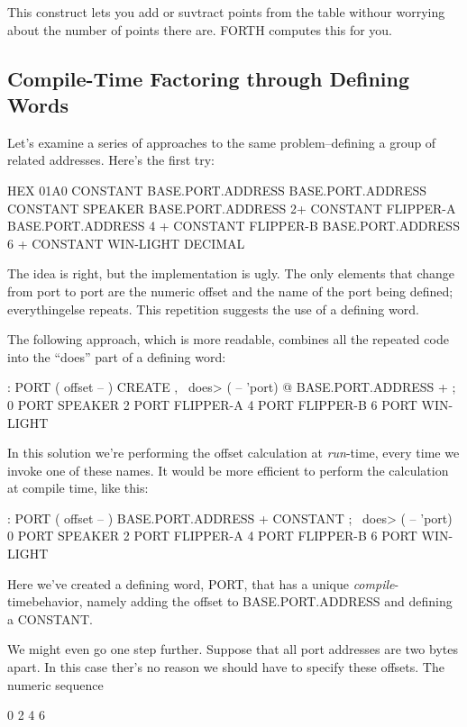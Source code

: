 This construct lets you add or suvtract points from the table withour worrying about the number of points there are. FORTH computes this for you.

\subsection{{Compile-Time Factoring through Defining Words}}

Let's examine a series of approaches to the same problem--defining a group of related addresses. Here's the first try:

\begin{Code}
HEX 01A0 CONSTANT BASE.PORT.ADDRESS
BASE.PORT.ADDRESS CONSTANT SPEAKER
BASE.PORT.ADDRESS 2+ CONSTANT FLIPPER-A
BASE.PORT.ADDRESS 4 + CONSTANT FLIPPER-B
BASE.PORT.ADDRESS 6 + CONSTANT WIN-LIGHT
DECIMAL
\end{Code}
The idea is right, but the implementation is ugly. The only elements that change from port to port are the numeric offset and the name of the port being defined; everythingelse repeats. This repetition suggests the use of a defining word.

The following approach, which is more readable, combines all the repeated code into the ``does'' part  of a defining word:

\begin{Code}
: PORT  ( offset -- )  CREATE ,
   \ does>  ( -- 'port) @ BASE.PORT.ADDRESS + ;
0 PORT SPEAKER
2 PORT FLIPPER-A
4 PORT FLIPPER-B
6 PORT WIN-LIGHT
\end{Code}
In this solution we're performing the offset calculation at \emph{run}-time, every time we invoke one of these names. It would be more efficient to perform the calculation at compile time, like this:

\begin{Code}
: PORT  ( offset -- )  BASE.PORT.ADDRESS + CONSTANT ;
   \ does>  ( -- 'port)
0 PORT SPEAKER
2 PORT FLIPPER-A
4 PORT FLIPPER-B
6 PORT WIN-LIGHT
\end{Code}
Here we've created a defining word, PORT, that has a unique \emph{compile}-timebehavior, namely adding the offset to BASE.PORT.ADDRESS and defining a CONSTANT.

We might even go one step further. Suppose that all port addresses are two bytes apart. In this case ther's no reason we should have to specify these offsets. The numeric sequence

\medskip

0 2 4 6

